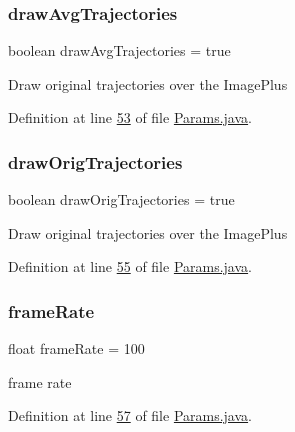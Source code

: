 \subsubsection{\texorpdfstring{draw\+Avg\+Trajectories}{drawAvgTrajectories}}
{\footnotesize\ttfamily boolean draw\+Avg\+Trajectories = true\hspace{0.3cm}{\ttfamily [static]}}

Draw original trajectories over the Image\+Plus 

Definition at line \hyperlink{_params_8java_source_l00053}{53} of file \hyperlink{_params_8java_source}{Params.\+java}.

\hypertarget{classdata_1_1_params_a207f2cfc882f842eafc04f6531308e98}{}\label{classdata_1_1_params_a207f2cfc882f842eafc04f6531308e98} 
\subsubsection{\texorpdfstring{draw\+Orig\+Trajectories}{drawOrigTrajectories}}
{\footnotesize\ttfamily boolean draw\+Orig\+Trajectories = true\hspace{0.3cm}{\ttfamily [static]}}

Draw original trajectories over the Image\+Plus 

Definition at line \hyperlink{_params_8java_source_l00055}{55} of file \hyperlink{_params_8java_source}{Params.\+java}.

\hypertarget{classdata_1_1_params_a398ccb086e2e7150576bec8a5853b8e3}{}\label{classdata_1_1_params_a398ccb086e2e7150576bec8a5853b8e3} 
\subsubsection{\texorpdfstring{frame\+Rate}{frameRate}}
{\footnotesize\ttfamily float frame\+Rate = 100\hspace{0.3cm}{\ttfamily [static]}}

frame rate 

Definition at line \hyperlink{_params_8java_source_l00057}{57} of file \hyperlink{_params_8java_source}{Params.\+java}.

\hypertarget{classdata_1_1_params_a253e4e926c0399ed1ae42b5a5989824d}{}\label{classdata_1_1_params_a253e4e926c0399ed1ae42b5a5989824d} 
